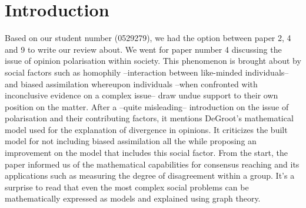 \documentclass[14]{article}
\begin{document}
\author{\textbf{Faculty of Sciences and Bio-Engineering Sciences}\\[2\baselineskip]\newline\textbf{Arthur Chomé - 0529279}}

\date{ \LARGE Assignment 3: Review}
\title{\vspace{-6cm}}%

\maketitle

\section{Introduction}
Based on our student number (0529279), we had the option between paper 2, 4 and 9 to write our review about. We went for paper number 4\cite{dandekar2013biased} discussing the issue of opinion polarisation within society. 
This phenomenon is brought about by social factors such as homophily --interaction between like-minded individuals-- and biased assimilation whereupon individuals --when confronted with inconclusive evidence on a complex issue-- draw undue support to their own position on the matter. After a --quite misleading-- introduction on the issue of polarisation and their contributing factors, it mentions DeGroot's mathematical model\cite{degroot1974reaching} used for the explanation of divergence in opinions. It criticizes the built model for not including biased assimilation all the while proposing an improvement on the model that includes this social factor. From the start, the paper informed us of the mathematical capabilities for consensus reaching and its applications such as measuring the degree of disagreement within a group. It's a surprise to read that even the most complex social problems can be mathematically expressed as models and explained using graph theory.
\end{document}
